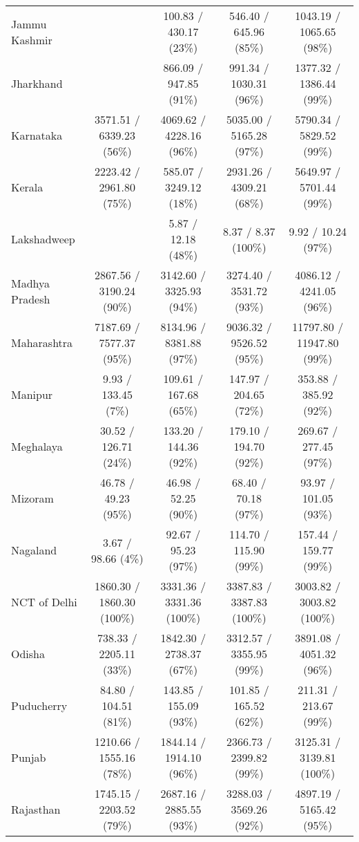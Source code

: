 \begin{center}
{\begin{tabular}{l|c|c|c|c}
Jammu Kashmir            & & 100.83 / 430.17 (23\%) & 546.40 / 645.96 (85\%) & 1043.19 / 1065.65 (98\%) \\
Jharkhand                & & 866.09 / 947.85 (91\%) & 991.34 / 1030.31 (96\%) & 1377.32 / 1386.44 (99\%) \\
\hline
Karnataka                & 3571.51 / 6339.23 (56\%) & 4069.62 / 4228.16 (96\%) & 5035.00 / 5165.28 (97\%) & 5790.34 / 5829.52 (99\%) \\
Kerala                   & 2223.42 / 2961.80 (75\%) & 585.07 / 3249.12 (18\%) & 2931.26 / 4309.21 (68\%) & 5649.97 / 5701.44 (99\%) \\
Lakshadweep              & & 5.87 / 12.18 (48\%) & 8.37 / 8.37 (100\%) & 9.92 / 10.24 (97\%) \\
Madhya Pradesh           & 2867.56 / 3190.24 (90\%) & 3142.60 / 3325.93 (94\%) & 3274.40 / 3531.72 (93\%) & 4086.12 / 4241.05 (96\%) \\
Maharashtra              & 7187.69 / 7577.37 (95\%) & 8134.96 / 8381.88 (97\%) & 9036.32 / 9526.52 (95\%) & 11797.80 / 11947.80 (99\%) \\
\hline
Manipur                  & 9.93 / 133.45 (7\%) & 109.61 / 167.68 (65\%) & 147.97 / 204.65 (72\%) & 353.88 / 385.92 (92\%) \\
Meghalaya                & 30.52 / 126.71 (24\%) & 133.20 / 144.36 (92\%) & 179.10 / 194.70 (92\%) & 269.67 / 277.45 (97\%) \\
Mizoram                  & 46.78 / 49.23 (95\%) & 46.98 / 52.25 (90\%) & 68.40 / 70.18 (97\%) & 93.97 / 101.05 (93\%) \\
Nagaland                 & 3.67 / 98.66 (4\%) & 92.67 / 95.23 (97\%) & 114.70 / 115.90 (99\%) & 157.44 / 159.77 (99\%) \\
NCT of Delhi             & 1860.30 / 1860.30 (100\%) & 3331.36 / 3331.36 (100\%) & 3387.83 / 3387.83 (100\%) & 3003.82 / 3003.82 (100\%) \\
\hline
Odisha                   & 738.33 / 2205.11 (33\%) & 1842.30 / 2738.37 (67\%) & 3312.57 / 3355.95 (99\%) & 3891.08 / 4051.32 (96\%) \\
Puducherry               & 84.80 / 104.51 (81\%) & 143.85 / 155.09 (93\%) & 101.85 / 165.52 (62\%) & 211.31 / 213.67 (99\%) \\
Punjab                   & 1210.66 / 1555.16 (78\%) & 1844.14 / 1914.10 (96\%) & 2366.73 / 2399.82 (99\%) & 3125.31 / 3139.81 (100\%) \\
Rajasthan                & 1745.15 / 2203.52 (79\%) & 2687.16 / 2885.55 (93\%) & 3288.03 / 3569.26 (92\%) & 4897.19 / 5165.42 (95\%) \\

\end{tabular}}
\end{center}

